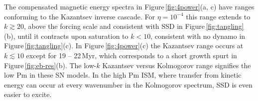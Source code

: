 \documentclass[preprint2]{aastex63}
\begin{document}
 The compensated magnetic energy spectra in Figure\,\ref{fig:4power}(a, c)
 have ranges conforming to the Kazantsev inverse cascade.
 For $\eta=10^{-4}$ this range extends to $k\gtrsim 20$, above the forcing
 scale and consistent with SSD in Figure\,\ref{fig:tangling}(b), 
 until it contracts upon saturation to $k<10$, consistent with no dynamo in
 Figure\,\ref{fig:tangling}(c).
 In Figure\,\ref{fig:4power}(c) the Kazantsev range occurs at $k\lesssim10$
 except for 19 -- 22\,Myr, which corresponds to a short growth spurt in
 Figure\,\ref{fig:eb-res}(b).
 The low-$k$ Kazantsev versus Kolmogorov range signifies the low Pm in these
 SN models. 
 In the high Pm ISM, where transfer from kinetic energy can occur at every
 wavenumber in the Kolmogorov spectrum, SSD is even easier to excite.

\end{document}
